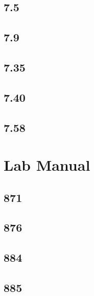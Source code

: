 \documentclass{article}
\begin{document}
\subsection{7.5}

\subsection{7.9}

\subsection{7.35}

\subsection{7.40}

\subsection{7.58}

\section{Lab Manual}

\subsection{871}

\subsection{876}

\subsection{884}

\subsection{885}
\end{document}
